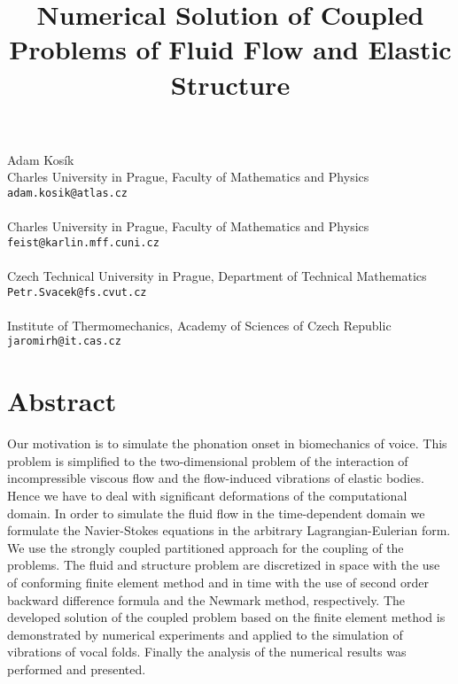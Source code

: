\title{Numerical Solution of Coupled Problems of Fluid Flow and Elastic Structure}
 \author{} \institute{}
\maketitle
\begin{center}
{\large Adam Kos\' ik}\\
Charles University in Prague, Faculty of Mathematics and Physics\\
{\tt adam.kosik@atlas.cz}
\\ \vspace{4mm}{\large Miloslav Feistauer}\\
Charles University in Prague, Faculty of Mathematics and Physics\\
{\tt feist@karlin.mff.cuni.cz}
\\ \vspace{4mm}{\large Petr Sv\' a\v cek}\\
Czech Technical University in Prague, Department of Technical Mathematics\\
{\tt Petr.Svacek@fs.cvut.cz}
\\ \vspace{4mm}{\large Jarom\' ir Hor\' a\v cek}\\
Institute of Thermomechanics, Academy of Sciences of Czech Republic\\
{\tt jaromirh@it.cas.cz}

\end{center}

\section*{Abstract}

Our motivation is to simulate the phonation onset in biomechanics of voice. This problem is simplified to the two-dimensional problem of the interaction of incompressible viscous flow and the flow-induced vibrations of elastic bodies. Hence we have to deal with significant deformations of the computational domain. In order to simulate the fluid flow in the time-dependent domain we formulate the Navier-Stokes equations in the arbitrary Lagrangian-Eulerian form. We use the strongly coupled partitioned approach for the coupling of the problems. The fluid and structure problem are discretized in space with the use of conforming finite element method and in time with the use of second order backward difference formula and the Newmark method, respectively.  The developed solution of the coupled problem based on the finite element method is demonstrated by numerical experiments and applied to the simulation of vibrations of vocal folds. Finally the analysis of the numerical results was performed and presented.

